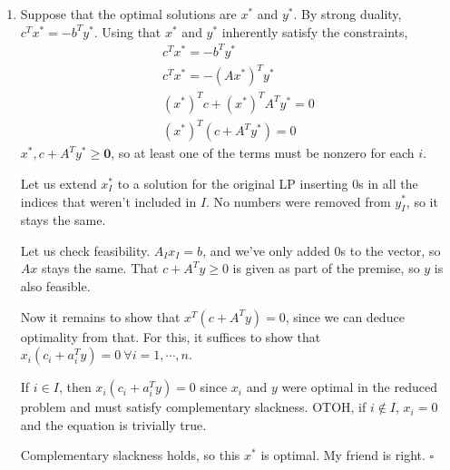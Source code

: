 \documentclass[12pt]{article}
\begin{document}
\begin{enumerate}
            \pagebreak

      \item Suppose that the optimal solutions are $x^*$ and $y^*$.
            By strong duality, $c^Tx^*=-b^Ty^*$.
            Using that $x^*$ and $y^*$ inherently satisfy the constraints,
            \begin{gather*}
                  c^Tx^*=-b^Ty^* \\
                  c^Tx^*=-(Ax^*)^Ty^* \\
                  (x^*)^T c + (x^*)^T A^T y^*=0 \\
                  (x^*)^T (c + A^T y^*) = 0
            \end{gather*}
            $x^*, c+A^Ty^* \ge \mathbf{0}$, so at least one of the terms must be nonzero for each $i$.

            Let us extend $x_I^*$ to a solution for the original LP
            inserting $0$s in all the indices that weren't included in $I$.
            No numbers were removed from $y_I^*$, so it stays the same.

            Let us check feasibility.
            $A_I x_I = b$, and we've only added $0$s to the vector,
            so $Ax$ stays the same.
            That $c+A^Ty \ge 0$ is given as part of the premise, so $y$ is also feasible.

            Now it remains to show that $x^T(c+A^T y)=0$, since we can deduce optimality from that.
            For this, it suffices to show that $x_i(c_i+a^T_i y)=0\ \forall i=1, \cdots, n$.

            If $i \in I$, then $x_i(c_i+a^T_i y)=0$ since $x_i$ and $y$
            were optimal in the reduced problem and must satisfy complementary slackness.
            OTOH, if $i \notin I$, $x_i = 0$ and the equation is trivially true.

            Complementary slackness holds, so this $x^*$ is optimal.
            My friend is right. $\square$
\end{enumerate}
\end{document}

